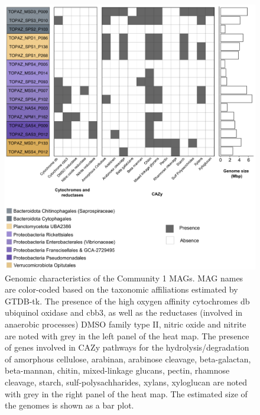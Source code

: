 \documentclass[12pt]{article}
\numberwithin{equation}{section}
\begin{document}
\begin{figure}[h!]    
    \centering
    \includegraphics[width = 0.75\columnwidth]{si-figures/Heatmap_mod.png}
    \caption{Genomic characteristics of the Community 1 MAGs. MAG names are color-coded based on the taxonomic affiliations estimated by GTDB-tk. The presence of the high oxygen affinity cytochromes db ubiquinol oxidase and cbb3, as well as the reductases (involved in anaerobic processes) DMSO family type II, nitric oxide and nitrite are noted with grey in the left panel of the heat map. The presence of genes involved in CAZy pathways for the hydrolysis/degradation of amorphous cellulose, arabinan, arabinose cleavage, beta-galactan, beta-mannan, chitin, mixed-linkage glucans, pectin, rhamnose cleavage, starch, sulf-polysachharides, xylans, xyloglucan are noted with grey in the right panel of the heat map. The estimated size of the genomes is shown as a bar plot.}
    \label{fig:community1-bact}
\end{figure}

\clearpage





\end{document}

